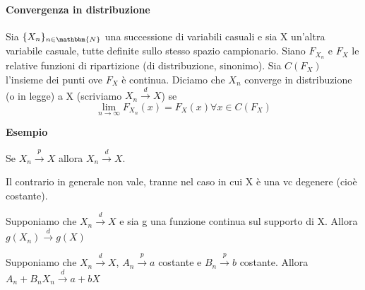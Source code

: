 \paragraph{Convergenza in distribuzione}
\begin{definizione}

Sia $\{X_n\}_{n\in\mathbbm{N}}$ una successione di variabili casuali e 
sia X un'altra variabile casuale, tutte definite sullo stesso spazio campionario.
Siano $F_{X_n}$ e $F_X$ le relative funzioni di ripartizione (di distribuzione, sinonimo).
Sia $C(F_X)$ l'insieme dei punti ove $F_X$ è continua. 
Diciamo che $X_n$ converge in distribuzione (o in legge) a X (scriviamo $X_n\stackrel{d}{\rightarrow}X$) se 
$$\lim_{n \rightarrow\infty} F_{X_n}(x)=F_X(x) \forall x \in C(F_X)$$
\end{definizione}
\textbf{Esempio}
\begin{teo}
Se $X_n\stackrel{p}{\rightarrow}X$ allora $X_n\stackrel{d}{\rightarrow}X$.
\end{teo}
\begin{oss}
Il contrario in generale non vale, tranne nel caso in cui X è una vc degenere (cioè costante).
\end{oss}
\begin{teo} Supponiamo che $X_n\stackrel{d}{\rightarrow}X$ e sia g una funzione continua sul supporto di X. Allora $g(X_n)\stackrel{d}{\rightarrow}g(X)$
\end{teo}
\begin{teo} [Slutsky] Supponiamo che $X_n\stackrel{d}{\rightarrow}X$, $A_n\stackrel{p}{\rightarrow}a$ costante e $B_n\stackrel{p}{\rightarrow}b$ costante. Allora $A_n+B_n X_n\stackrel{d}{\rightarrow}a+bX$
\end{teo}
